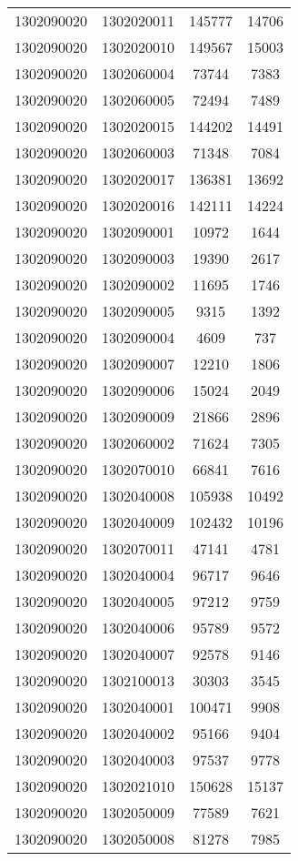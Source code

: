 \begin{longtable}[h]{llcc}
		1302090020 & 1302020011 & 145777 & 14706\\
		1302090020 & 1302020010 & 149567 & 15003\\
		1302090020 & 1302060004 & 73744 & 7383\\
		1302090020 & 1302060005 & 72494 & 7489\\
		1302090020 & 1302020015 & 144202 & 14491\\
		1302090020 & 1302060003 & 71348 & 7084\\
		1302090020 & 1302020017 & 136381 & 13692\\
		1302090020 & 1302020016 & 142111 & 14224\\
		1302090020 & 1302090001 & 10972 & 1644\\
		1302090020 & 1302090003 & 19390 & 2617\\
		1302090020 & 1302090002 & 11695 & 1746\\
		1302090020 & 1302090005 & 9315 & 1392\\
		1302090020 & 1302090004 & 4609 & 737\\
		1302090020 & 1302090007 & 12210 & 1806\\
		1302090020 & 1302090006 & 15024 & 2049\\
		1302090020 & 1302090009 & 21866 & 2896\\
		1302090020 & 1302060002 & 71624 & 7305\\
		1302090020 & 1302070010 & 66841 & 7616\\
		1302090020 & 1302040008 & 105938 & 10492\\
		1302090020 & 1302040009 & 102432 & 10196\\
		1302090020 & 1302070011 & 47141 & 4781\\
		1302090020 & 1302040004 & 96717 & 9646\\
		1302090020 & 1302040005 & 97212 & 9759\\
		1302090020 & 1302040006 & 95789 & 9572\\
		1302090020 & 1302040007 & 92578 & 9146\\
		1302090020 & 1302100013 & 30303 & 3545\\
		1302090020 & 1302040001 & 100471 & 9908\\
		1302090020 & 1302040002 & 95166 & 9404\\
		1302090020 & 1302040003 & 97537 & 9778\\
		1302090020 & 1302021010 & 150628 & 15137\\
		1302090020 & 1302050009 & 77589 & 7621\\
		1302090020 & 1302050008 & 81278 & 7985\\

\end{longtable}
